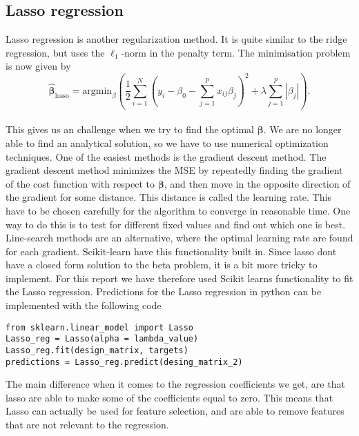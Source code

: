 \subsection{Lasso regression}
Lasso regression is another regularization method. It is quite similar to the ridge regression, but uses the $\ell_1$-norm in the penalty term. The minimisation problem is now given by 
\begin{equation}
    \hat{\boldsymbol{\beta}}_{\text{lasso}} = \text{argmin}_\beta\left( \frac{1}{2} \sum_{i=1}^N( y_i - \beta_0 - \sum_{j=1}^p x_{ij}\beta_j)^2 + \lambda \sum_{j=1}^p |\beta_j|\right).
\end{equation}\cite{hastie}
\\
This gives us an challenge when we try to find the optimal $\boldsymbol{\beta}$. We are no longer able to find an analytical solution, so we have to use numerical optimization techniques.\cite{Hands-On} One of the easiest methods is the gradient descent method. The gradient descent method minimizes the MSE by repeatedly finding the gradient of the cost function with respect to $\boldsymbol{\beta}$, and then move in the opposite direction of the gradient for some distance. This distance is called the learning rate. This have to be chosen carefully for the algorithm to converge in reasonable time. One way to do this is to test for different fixed values and find out which one is best. Line-search methods are an alternative, where the optimal learning rate are found for each gradient.\cite{NumOpt} Scikit-learn have this functionality built in. Since lasso dont have a closed form solution to the beta problem, it is a bit more tricky to implement. For this report we have therefore used Scikit learns functionality to fit the Lasso regression. Predictions for the Lasso regression in python can be implemented with the following code
\begin{lstlisting}
from sklearn.linear_model import Lasso
Lasso_reg = Lasso(alpha = lambda_value)
Lasso_reg.fit(design_matrix, targets)
predictions = Lasso_reg.predict(desing_matrix_2)
\end{lstlisting}
The main difference when it comes to the regression coefficients we get, are that lasso are able to make some of the coefficients equal to zero. This means that Lasso can actually be used for feature selection, and are able to remove features that are not relevant to the regression.\cite{hastie} 

